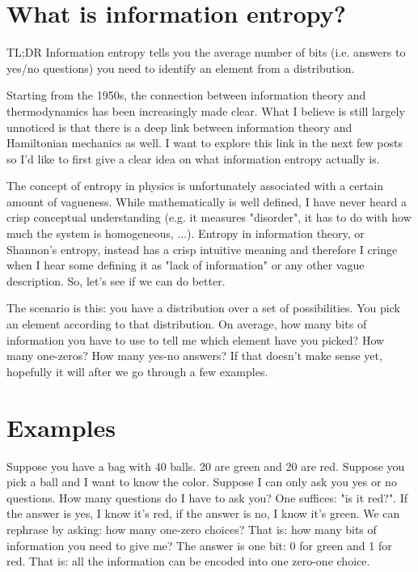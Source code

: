 \documentclass[aps,pra,10pt,floatfix,nofootinbib]{revtex4-1}
\theoremstyle{definition}
\begin{document}
	
\section{What is information entropy?}

TL;DR Information entropy tells you the average number of bits (i.e. answers to yes/no questions) you need to identify an element from a distribution.

Starting from the 1950s, the connection between information theory and thermodynamics has been increasingly made clear. What I believe is still largely unnoticed is that there is a deep link between information theory and Hamiltonian mechanics as well. I want to explore this link in the next few posts so I'd like to first give a clear idea on what information entropy actually is.

The concept of entropy in physics is unfortunately associated with a certain amount of vagueness. While mathematically is well defined, I have never heard a crisp conceptual understanding (e.g. it measures "disorder", it has to do with how much the system is homogeneous, ...). Entropy in information theory, or Shannon's entropy, instead has a crisp intuitive meaning and therefore I cringe when I hear some defining it as "lack of information" or any other vague description. So, let's see if we can do better.

The scenario is this: you have a distribution over a set of possibilities. You pick an element according to that distribution. On average, how many bits of information you have to use to tell me which element have you picked? How many one-zeros? How many yes-no answers? If that doesn't make sense yet, hopefully it will after we go through a few examples.

\section{Examples}

Suppose you have a bag with 40 balls. 20 are green and 20 are red. Suppose you pick a ball and I want to know the color. Suppose I can only ask you yes or no questions. How many questions do I have to ask you? One suffices: "is it red?". If the answer is yes, I know it's red, if the answer is no, I know it's green. We can rephrase by asking: how many one-zero choices? That is: how many bits of information you need to give me? The answer is one bit: 0 for green and 1 for red. That is: all the information can be encoded into one zero-one choice.
\end{document}

